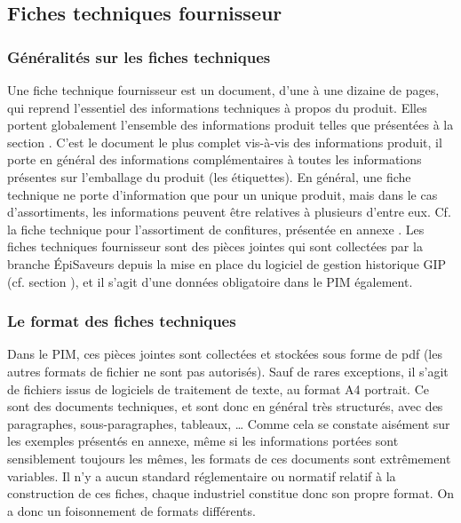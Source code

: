             \subsection{Fiches techniques fournisseur}
            \label{fiches_techniques}

                \subsubsection{Généralités sur les fiches techniques}
            Une fiche technique fournisseur est un document, d'une à une dizaine de pages, qui reprend l'essentiel des informations techniques à propos du produit.
            Elles portent globalement l'ensemble des informations produit telles que présentées à la section .
            C'est le document le plus complet vis-à-vis des informations produit, il porte en général des informations complémentaires à toutes les informations présentes sur l'emballage du produit (les étiquettes).
            En général, une fiche technique ne porte d'information que pour un unique produit, mais dans le cas d'assortiments, les informations peuvent être relatives à plusieurs d'entre eux. Cf. la fiche technique pour l'assortiment de confitures, présentée en annexe .
            Les fiches techniques fournisseur sont des pièces jointes qui sont collectées par la branche \'{E}piSaveurs depuis la mise en place du logiciel de gestion historique GIP (cf. section ), et il s'agit d'une données obligatoire dans le PIM également.
            
                \subsubsection{Le format des fiches techniques}
            Dans le PIM, ces pièces jointes sont collectées et stockées sous forme de pdf (les autres formats de fichier ne sont pas autorisés).
            Sauf de rares exceptions, il s'agit de fichiers issus de logiciels de traitement de texte, au format A4 portrait.
            Ce sont des documents techniques, et sont donc en général très structurés, avec des paragraphes, sous-paragraphes, tableaux, \dots
            Comme cela se constate aisément sur les exemples présentés en annexe, même si les informations portées sont sensiblement toujours les mêmes, les formats de ces documents sont extrêmement variables.
            Il n'y a aucun standard réglementaire ou normatif relatif à la construction de ces fiches, chaque industriel constitue donc son propre format.
            On a donc un foisonnement de formats différents.

